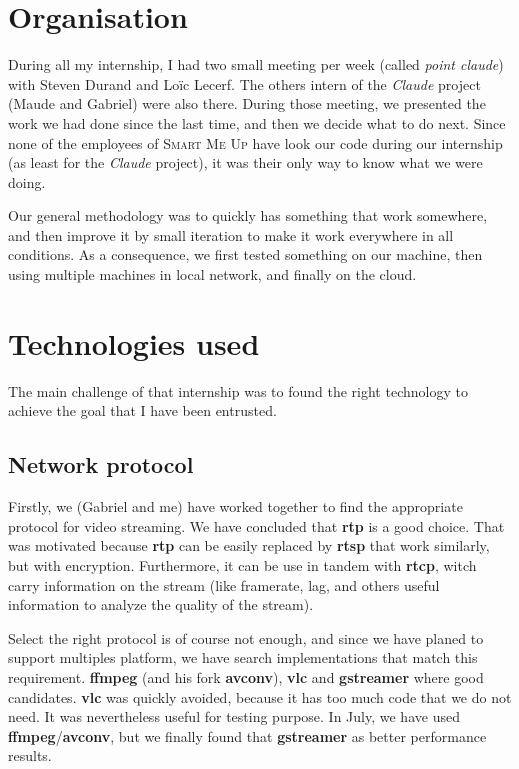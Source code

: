 \documentclass[a4paper,11pt]{custom}
\newcommand{\smu}{\textsc{Smart Me Up}\xspace}
\newcommand{\rtp}{\textbf{rtp}\xspace}
\newcommand{\rtcp}{\textbf{rtcp}\xspace}
\newcommand{\rtsp}{\textbf{rtsp}\xspace}
\newcommand{\vlc}{\textbf{vlc}\xspace}
\newcommand{\avconv}{\textbf{avconv}\xspace}
\newcommand{\ffmpeg}{\textbf{ffmpeg}\xspace}
\newcommand{\gstreamer}{\textbf{gstreamer}\xspace}
\newcommand{\claude}{\textit{Claude}\xspace}
\begin{document}
\section{Organisation}

During all my internship, I had two small meeting per week (called \textit{point
claude}) with Steven Durand and Loïc Lecerf. The others intern of the \claude{}
project (Maude and Gabriel) were also there. During those meeting, we presented
the work we had done since the last time, and then we decide what to do next.
Since none of the employees of \smu{} have look our code during our internship (as
least for the \claude{} project), it was their only way to know what we were
doing.

Our general methodology was to quickly has something that work somewhere, and
then improve it by small iteration to make it work everywhere in all conditions.
As a consequence, we first tested something on our machine, then using multiple
machines in local network, and finally on the cloud.


\section{Technologies used}
\label{sec:technologies}

The main challenge of that internship was to found the right technology to
achieve the goal that I have been entrusted.

\subsection{Network protocol}

Firstly, we (Gabriel and me) have worked together to find the appropriate
protocol for video streaming. We have concluded that \rtp{} is a good choice.
That was motivated because \rtp{} can be easily replaced by \rtsp{} that work
similarly, but with encryption. Furthermore, it can be use in tandem with
\rtcp, witch carry information on the stream (like framerate, lag, and others
useful information to analyze the quality of the stream).

Select the right protocol is of course not enough, and since we have planed to
support multiples platform, we have search implementations that match this
requirement. \ffmpeg{} (and his fork \avconv), \vlc{} and \gstreamer{} where good
candidates. \vlc{} was quickly avoided, because it has too much code that we do
not need. It was nevertheless useful for testing purpose. In July, we have used
\ffmpeg/\avconv, but we finally found that \gstreamer{} as better performance
results.
\end{document}
